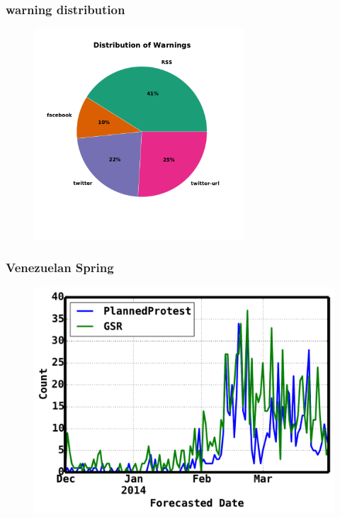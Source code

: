 \documentclass[red]{beamer}
\begin{document}
\begin{frame}
    \frametitle{warning distribution}
    \begin{figure}
        \centering
        \includegraphics[width=0.7\textwidth]{warnings_sources}
    \end{figure}
\end{frame}

\begin{frame}
     \frametitle{Venezuelan Spring}
     \begin{figure}
        \centering
        \includegraphics[scale=0.4]{venezuela}
     \end{figure}
\end{frame}
\end{document}
